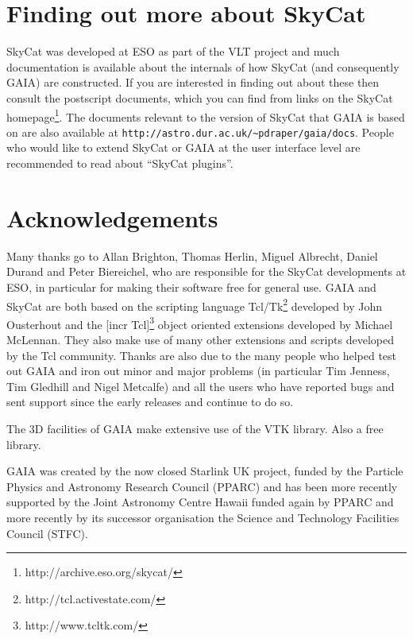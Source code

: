 \documentclass[twoside,11pt]{article}
\newcommand{\htmladdnormallinkfoot}[2]{#1\footnote{#2}}
\newcommand{\htmladdnormallink}[2]{#1}
\newcommand{\xlabel}[1]{}
\renewcommand{\_}{\texttt{\symbol{95}}}
\newcommand{\mytt}[1]{{\texttt{#1}}}
\begin{document}
\section{\xlabel{finding_out_more_about_skycat}Finding out more about SkyCat}
\htmladdnormallink{SkyCat}{http://archive.eso.org/skycat/} was
developed at \htmladdnormallink{ESO}{http://www.eso.org/} as part of
the \htmladdnormallink{VLT}{http://www.eso.org/vlt/} project and much
documentation is available about the internals of how SkyCat (and
consequently GAIA) are constructed. If you are interested in finding
out about these then consult the postscript documents, which you can
find from links on the \htmladdnormallinkfoot{SkyCat
homepage}{http://archive.eso.org/skycat/}. The documents relevant to
the version of SkyCat that GAIA is based on are also available at
\htmladdnormallink{\mytt{http://astro.dur.ac.uk/\~{}pdraper/gaia/docs}}
{http://astro.dur.ac.uk/~pdraper/gaia/docs}. People who would like
to extend SkyCat or GAIA at the user interface level are recommended
to read about ``SkyCat plugins''.


\section{\xlabel{acknowledgements}Acknowledgements}

Many thanks go to Allan Brighton, Thomas Herlin, Miguel Albrecht,
Daniel Durand and Peter Biereichel, who are responsible for the
\htmladdnormallink{SkyCat}{http://archive.eso.org/skycat/}
developments at ESO, in particular for making their software free for
general use.
GAIA and SkyCat are both based on the scripting language
\htmladdnormallinkfoot{Tcl/Tk}{http://tcl.activestate.com/} developed by
John Ousterhout and the \htmladdnormallinkfoot{[incr Tcl]}
{http://www.tcltk.com/} object oriented extensions developed by
Michael McLennan.
They also make use of many other extensions and scripts developed by
the Tcl community.
Thanks are also due to the many people who helped test out GAIA and
iron out minor and major problems (in particular Tim Jenness, Tim
Gledhill and Nigel Metcalfe) and all the users who have reported bugs
and sent support since the early releases and continue to do so.

The 3D facilities of GAIA make extensive use of the 
\htmladdnormallink{VTK}{http://www.kitware.com} library. Also a free
library.

GAIA was created by the now closed Starlink UK project, funded by the Particle
Physics and Astronomy Research Council (PPARC) and has been more recently
supported by the Joint Astronomy Centre Hawaii funded again by PPARC and more
recently by its successor organisation the Science and Technology Facilities
Council (STFC).

\end{document}
